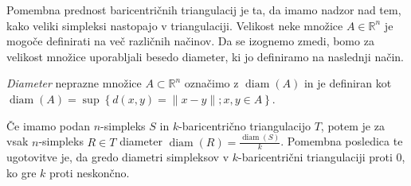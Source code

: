\documentclass[mat1]{fmfdelo}
\newcommand{\R}{\mathbb R}
\DeclareMathOperator{\diam}{diam}
\newcommand{\0}{\underline{0}}
\begin{document}
Pomembna prednost baricentričnih triangulacij je ta, da imamo nadzor nad tem, kako veliki simpleksi nastopajo v triangulaciji. Velikost neke množice $A \in \R^n$ je mogoče definirati na več različnih načinov. Da se izognemo zmedi, bomo za velikost množice uporabljali besedo diameter, ki  jo definiramo na naslednji način.
\begin{definicija}
\emph{Diameter} neprazne množice $A \subset \R^n$ označimo z $\diam(A)$ in je definiran kot $\diam(A) = \sup \left \{ d(x, y) = \| x - y \|; x, y \in A \right \}$.
\end{definicija}
Če imamo podan $n$-simpleks $S$ in $k$-baricentrično triangulacijo $T$, potem je za vsak $n$-simpleks $R \in T$ diameter $\diam(R) = \frac{\diam(S)}{k}$. Pomembna posledica te ugotovitve je, da gredo diametri simpleksov v $k$-baricentrični triangulaciji proti $0$, ko gre $k$ proti neskončno.
\end{document}
